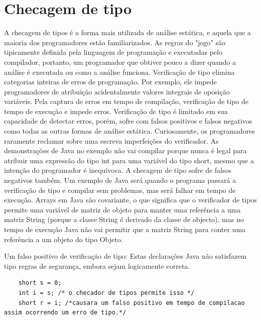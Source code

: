 	\section {Checagem de tipo}
	A checagem de tipos é a forma mais utilizada de análise estática, e aquela que a maioria dos programadores estão familiarizados. As regras do "jogo" são tipicamente definida pela linguagem de programação e executadas pelo compilador, portanto, um programador que obtiver pouco a dizer quando a análise é executada ou como a análise funciona. Verificação de tipo elimina categorias inteiras de erros de programação. Por exemplo, ele impede programadores de atribuição acidentalmente valores integrais de oposição variáveis. Pela captura de erros em tempo de compilação, verificação de tipo de tempo de execução e impede erros. Verificação de tipo é limitado em sua capacidade de detectar erros, porém, sofre com falsos positivos e falsos negativos como todas as outras formas de análise estática. Curiosamente, os programadores raramente reclamar sobre uma escreva imperfeições do verificador. As demonstrações de Java no exemplo não vai compilar porque nunca é legal para atribuir uma expressão do tipo int para uma variável do tipo short, mesmo que a intenção do programador é inequívoca. A checagem de tipo sofre de falsos negativos também. Um exemplo de Java será quando o programa passará a verificação de tipo e compilar sem problemas, mas será falhar em tempo de execução. Arrays em Java são covariante, o que significa que o verificador de tipos permite uma variável de matriz de objeto para manter uma referência a uma matriz String (porque a classe String é derivado da classe de objecto), mas no tempo de execução Java não vai permitir que a matriz String para conter uma referência a um objeto do tipo Objeto.
	
	Um falso positivo de verificação de tipo: Estas declarações Java não satisfazem tipo regras de segurança, embora sejam logicamente correta.
	\begin{lstlisting}
	short s = 0;
	int i = s; /* o checador de tipos permite isso */
	short r = i; /*causara um falso positivo em tempo de compilacao assim ocorrendo um erro de tipo.*/
	\end{lstlisting}

